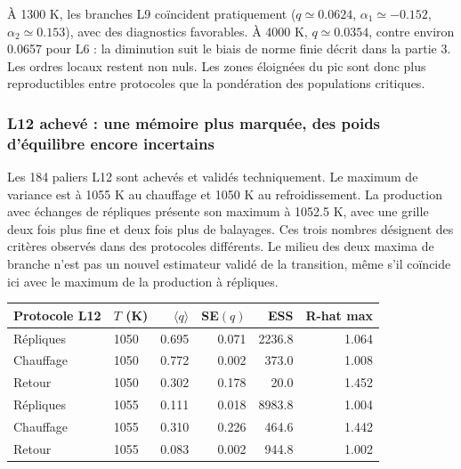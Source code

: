 À 1300 K, les branches L9 coïncident pratiquement ($q\simeq0.0624$, $\alpha_1\simeq-0.152$, $\alpha_2\simeq0.153$), avec des diagnostics favorables. À 4000 K, $q\simeq0.0354$, contre environ 0.0657 pour L6 : la diminution suit le biais de norme finie décrit dans la partie 3. Les ordres locaux restent non nuls. Les zones éloignées du pic sont donc plus reproductibles entre protocoles que la pondération des populations critiques.

\subsubsection{L12 achevé : une mémoire plus marquée, des poids d’équilibre encore incertains}

Les 184 paliers L12 sont achevés et validés techniquement. Le maximum de variance est à 1055 K au chauffage et 1050 K au refroidissement. La production avec échanges de répliques présente son maximum à 1052.5 K, avec une grille deux fois plus fine et deux fois plus de balayages. Ces trois nombres désignent des critères observés dans des protocoles différents. Le milieu des deux maxima de branche n’est pas un nouvel estimateur validé de la transition, même s’il coïncide ici avec le maximum de la production à répliques.


\begin{center}\small\begin{tabular}{llrrrr}\toprule

Protocole L12 & $T$ (K) & $\langle q\rangle$ & SE$(q)$ & ESS & R-hat max\\\midrule

Répliques & 1050 & 0.695 & 0.071 & 2236.8 & 1.064\\

Chauffage & 1050 & 0.772 & 0.002 & 373.0 & 1.008\\

Retour & 1050 & 0.302 & 0.178 & 20.0 & 1.452\\

Répliques & 1055 & 0.111 & 0.018 & 8983.8 & 1.004\\

Chauffage & 1055 & 0.310 & 0.226 & 464.6 & 1.442\\

Retour & 1055 & 0.083 & 0.002 & 944.8 & 1.002\\

\bottomrule\end{tabular}\end{center}

